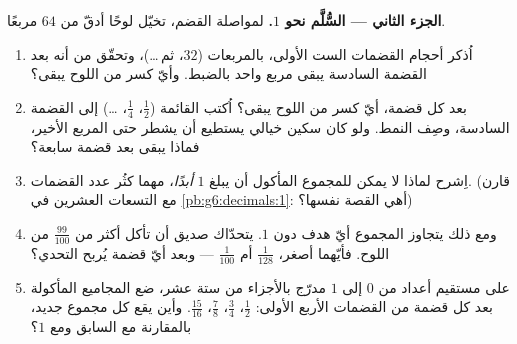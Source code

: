 \begin{problem}
\medskip
\noindent\textbf{الجزء الثاني --- السُّلَّم نحو $1$.}
لمواصلة القضم، تخيّل لوحًا أدقّ من $64$ مربعًا.
\begin{enumerate}[resume]
  \item اُذكر أحجام القضمات الست الأولى، بالمربعات
        ($32$، ثم\,\dots)، وتحقّق من أنه بعد القضمة السادسة
        يبقى مربع واحد بالضبط. وأيّ كسر من اللوح
        يبقى؟
  \item بعد كل قضمة، أيّ كسر من اللوح يبقى؟ اُكتب
        القائمة ($\frac12$، $\frac14$، \dots) إلى القضمة
        السادسة، وصِف النمط. ولو كان سكين خيالي
        يستطيع أن يشطر حتى المربع الأخير، فماذا يبقى بعد
        قضمة سابعة؟
  \item اِشرح لماذا لا يمكن للمجموع المأكول أن يبلغ $1$
        \emph{أبدًا}، مهما كثُر عدد القضمات. (قارن مع
        التسعات العشرين في \cref{pb:g6:decimals:1}: أهي القصة نفسها؟)
  \item ومع ذلك يتجاوز المجموع أيّ هدف دون $1$. يتحدّاك
        صديق أن تأكل أكثر من $\frac{99}{100}$ من
        اللوح. فأيّهما أصغر، $\frac{1}{128}$ أم
        $\frac{1}{100}$ --- وبعد أيّ قضمة يُربح التحدي؟
  \item على مستقيم أعداد من $0$ إلى $1$ مدرّج بالأجزاء من ستة عشر،
        ضع المجاميع المأكولة بعد كل قضمة من القضمات الأربع
        الأولى: $\frac12$، $\frac34$، $\frac78$، $\frac{15}{16}$.
        وأين يقع كل مجموع جديد، بالمقارنة مع
        السابق ومع $1$؟
\end{enumerate}


\end{problem}
